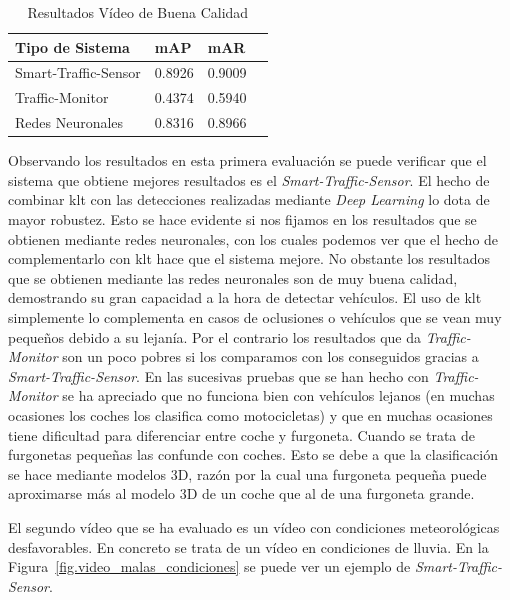 \begin{table}[H] 
\begin{center}
\begin{tabular}{|l|l|l|l|}
\hline
Tipo de Sistema & mAP & mAR  \\ 
\hline \hline
Smart-Traffic-Sensor & 0.8926 & 0.9009 \\ \hline
Traffic-Monitor & 0.4374 & 0.5940 \\ \hline
Redes Neuronales & 0.8316 & 0.8966\\ \hline
\end{tabular}
\caption{Resultados Vídeo de Buena Calidad}
\label{resultados_video_bueno}
\end{center}
\end{table}

Observando los resultados en esta primera evaluación se puede verificar que el sistema que obtiene mejores resultados es el \textit{Smart-Traffic-Sensor}. El hecho de combinar \acrshort{klt} con las detecciones realizadas mediante \textit{Deep Learning} lo dota de mayor robustez. Esto se hace evidente si nos fijamos en los resultados que se obtienen mediante redes neuronales, con los cuales podemos ver que el hecho de complementarlo con \acrshort{klt} hace que el sistema mejore. No obstante los resultados que se obtienen mediante las redes neuronales son de muy buena calidad, demostrando su gran capacidad a la hora de detectar vehículos. El uso de \acrshort{klt} simplemente lo complementa en casos de oclusiones o vehículos que se vean muy pequeños debido a su lejanía. Por el contrario los resultados que da \textit{Traffic-Monitor} son un poco pobres si los comparamos con los conseguidos gracias a \textit{Smart-Traffic-Sensor}. En las sucesivas pruebas que se han hecho con \textit{Traffic-Monitor} se ha apreciado que no funciona bien con vehículos lejanos (en muchas ocasiones los coches los clasifica como motocicletas) y que en muchas ocasiones tiene dificultad para diferenciar entre coche y furgoneta. Cuando se trata de furgonetas pequeñas las confunde con coches. Esto se debe a que la clasificación se hace mediante modelos 3D, razón por la cual una furgoneta pequeña puede aproximarse más al modelo 3D de un coche que al de una furgoneta grande.


El segundo vídeo que se ha evaluado es un vídeo con condiciones meteorológicas desfavorables. En concreto se trata de un vídeo en condiciones de lluvia. En la Figura~\ref{fig.video_malas_condiciones} se puede ver un ejemplo de \textit{Smart-Traffic-Sensor}.

